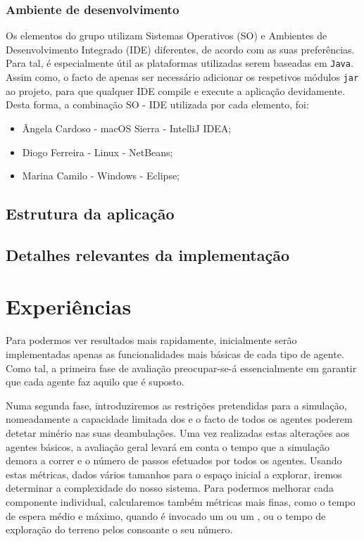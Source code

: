 \documentclass[12pt]{report}
\begin{document}
\subsection{Ambiente de desenvolvimento}

Os elementos do grupo utilizam Sistemas Operativos (SO) e Ambientes de Desenvolvimento Integrado (IDE) diferentes, de acordo com as suas preferências. Para tal, é especialmente útil as plataformas utilizadas serem baseadas em \texttt{Java}. Assim como, o facto de apenas ser necessário adicionar os respetivos módulos \texttt{jar} ao projeto, para que qualquer IDE compile e execute a aplicação devidamente. Desta forma, a combinação SO - IDE utilizada por cada elemento, foi:
\begin{itemize}
	\item Ângela Cardoso - macOS Sierra - IntelliJ IDEA;
	\item Diogo Ferreira - Linux - NetBeans;
	\item Marina Camilo - Windows - Eclipse;
\end{itemize}

\section{Estrutura da aplicação}


\section{Detalhes relevantes da implementação}


\chapter{Experiências}


Para podermos ver resultados mais rapidamente, inicialmente serão implementadas apenas as funcionalidades mais básicas de cada tipo de agente. Como tal, a primeira fase de avaliação preocupar-se-á essencialmente em garantir que cada agente faz aquilo que é suposto.

Numa segunda fase, introduziremos as restrições pretendidas para a simulação, nomeadamente a capacidade limitada dos \transporters e o facto de todos os agentes poderem detetar minério nas suas deambulações. Uma vez realizadas estas alterações aos agentes básicos, a avaliação geral levará em conta o tempo que a simulação demora a correr e o número de passos efetuados por todos os agentes. Usando estas métricas, dados vários tamanhos para o espaço inicial a explorar, iremos determinar a complexidade do nosso sistema. Para podermos melhorar cada componente individual, calcularemos também métricas mais finas, como o tempo de espera médio e máximo, quando é invocado um \producer ou um \transporter, ou o tempo de exploração do terreno pelos \spotters consoante o seu número.
\end{document}
